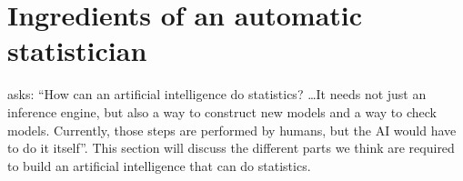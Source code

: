 





\section{Ingredients of an automatic statistician}
\label{sec:ingredients}
\citet{gelman2013philblogpost} asks: ``How can an artificial intelligence do statistics? \dots It needs not just an inference engine, but also a way to construct new models and a way to check models. Currently, those steps are performed by humans, but the AI would have to do it itself''.
%
This section will discuss the different parts we think are required to build an artificial intelligence that can do statistics.

